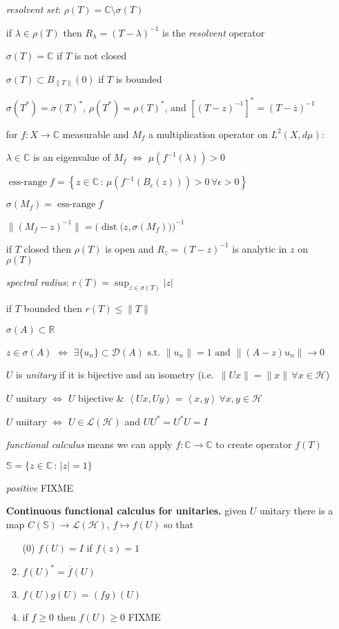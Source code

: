 \documentclass[12pt]{article}
\newcommand{\cD}{\mathcal{D}}
\newcommand{\cH}{\mathcal{H}}
\newcommand{\cL}{\mathcal{L}}
\newcommand{\CC}{\mathbb{C}}
\newcommand{\RR}{\mathbb{R}}
\renewcommand{\SS}{\mathbb{S}}
\newcommand{\ip}[2]{\left<#1,#2\right>}
\newcommand{\eps}{\epsilon}
\newcommand{\ds}{\displaystyle}
\begin{document}
\begin{itemize}[leftmargin=10mm,itemsep=0mm]
\item[\df{68}] \emph{resolvent set}: $\rho(T) = \CC\setminus \sigma(T)$
\item[\df{68}] if $\lambda\in\rho(T)$ then $R_\lambda = (T-\lambda)^{-1}$ is the \emph{resolvent} operator
\item[\ft{68}] $\sigma(T)=\CC$ if $T$ is not closed
\item[\ft{69}] $\sigma(T) \subset B_{\|T\|}(0)$ if $T$ is bounded
\item[\ft{69}] $\sigma(T^*) = \sigma(T)^*$, $\rho(T^*)=\rho(T)^*$, and $\left[(T-z)^{-1}\right]^* = \left(T-\overline{z}\right)^{-1}$
\item[\ft{71}] for  $f:X\to\CC$ measurable and $M_f$ a multiplication operator on $L^2(X,d\mu)$:

$\lambda\in\CC$ is an eigenvalue of $M_f$ $\iff$ $\mu(f^{-1}(\lambda))>0$
\item[\df{71}] $\operatorname{ess-range} f = \left\{z\in\CC\,:\,\mu(f^{-1}(B_\eps(z))) > 0 \, \forall \eps>0\right\}$
\item[\ft{71}] $\sigma(M_f) = \operatorname{ess-range} f$
\item[\ft{71}] $\|(M_f - z)^{-1}\| = \Big(\operatorname{dist}\big(z,\sigma(M_f)\big)\Big)^{-1}$
\item[\ft{83}] if $T$ closed then $\rho(T)$ is open and $R_z = (T-z)^{-1}$ is analytic in $z$ on $\rho(T)$
\item[\df{85}] \emph{spectral radius}: $\ds r(T) = \sup_{z \in \sigma(T)} |z|$
\item[\ft{85}] if $T$ bounded then $r(T) \le \|T\|$
\item[\ft{86}] $\sigma(A)\subset \RR$
\item[\ft{87}] $z\in\sigma(A)$ $\iff$ $\exists \{u_n\}\subset \cD(A) \text{ s.t.~} \|u_n\|=1 \text{ and } \|(A-z)u_n\| \to 0$
\item[\df{17}] $U$ is \emph{unitary} if it is bijective and an isometry (i.e.~$\|Ux\|=\|x\|\,\forall x\in\cH$)
\item[\ft{17}] $U$ unitary $\iff$ $U$ bijective \& $\ip{Ux}{Uy}=\ip{x}{y}\,\forall x,y\in\cH$
\item[\ft{102}] $U$ unitary $\iff$ $U\in\cL(\cH)$ and $UU^* = U^*U=I$
\item[\df{102}] \emph{functional calculus} means we can apply $f:\CC\to\CC$ to create operator $f(T)$
\item[\df{102}] $\SS = \{z\in\CC\,:\,|z|=1\}$
\item[\df{103}] \emph{positive} FIXME
\item[\ft{103}] \textbf{Continuous functional calculus for unitaries.} given $U$ unitary there is a map $C(\SS) \to \cL(\cH)$, $f\mapsto f(U)$ so that
\renewcommand{\labelenumi}{(\alph{enumi})}
\begin{enumerate}
\item[(0)] $f(U) = I$ if $f(z) = 1$
\setcounter{enumi}{0}
\item $f(U)^*=\overline{f}(U)$
\item $f(U)g(U) = (fg)(U)$
\item if $f\ge 0$ then $f(U)\ge 0$ FIXME
\end{enumerate}
\item[\df{}] 
\item[\ft{}] 
\end{itemize}
\end{document}
